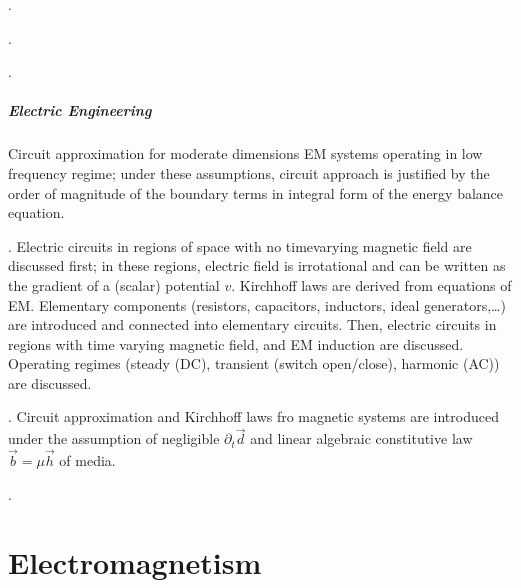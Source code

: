 \documentclass[letterpaper,10pt,english]{jupyterBook}
\begin{document}
\sphinxAtStartPar
{\hyperref[\detokenize{ch/energy:classical-electromagnetism-energy}]{}}.

\sphinxAtStartPar
{\hyperref[\detokenize{ch/regimes:classical-electromagnetism-regimes}]{}}.

\sphinxAtStartPar
{}.
\subsubsection*{Electric Engineering}

\sphinxAtStartPar
{} Circuit approximation for moderate dimensions EM systems operating in low frequency regime; under these assumptions, circuit approach is justified by the order of magnitude of the boundary terms in integral form of the energy balance equation.

\sphinxAtStartPar
{}. Electric circuits in regions of space with no time\sphinxhyphen{}varying magnetic field are discussed first; in these regions, electric field is irrotational and can be written as the gradient of a (scalar) potential \(v\). Kirchhoff laws are derived from equations of EM. Elementary components (resistors, capacitors, inductors, ideal generators,…) are introduced and connected into elementary circuits. Then, electric circuits in regions with time varying magnetic field, and EM induction are discussed. Operating regimes (steady (DC), transient (switch open/close), harmonic (AC)) are discussed.

\sphinxAtStartPar
{}. Circuit approximation and Kirchhoff laws fro magnetic systems are introduced under the assumption of negligible \(\partial_t \vec{d}\) and linear algebraic constitutive law \(\vec{b} = \mu \vec{h}\) of media.

\sphinxAtStartPar
{}.

\sphinxstepscope


\part{Electromagnetism}
\end{document}
